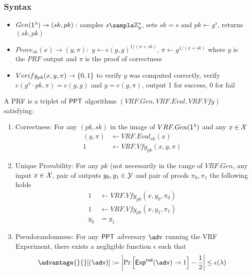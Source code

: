 \subsubsection{Syntax}
\begin{itemize}
    \item $Gen(\mathsf{1^{\lambda}}) \to (sk, pk):$ samples $s \sample \Zp^*$, sets $sk = s$ and $pk \gets g^s$, returns $(sk, pk)$
    \item $Prove_{sk}(x) \to (y, \pi):$ $y \gets e(g,g)^{1/(x+sk)}$, $\pi \gets g^{1/(x+sk)}$ where $y$ is the $PRF$ output and $\pi$ is the proof of correctness
    \item $Verify_{pk}(x, y, \pi) \to \{0,1\}$ to verify $y$ was computed correctly, verify $e(g^x \cdot pk, \pi) = e(g,g)$ and $y = e(g, \pi)$, output 1 for success, 0 for fail
\end{itemize}

\begin{definition}

    A PRF is a triplet of $\mathsf{PPT}$ algorithms $(VRF.Gen, VRF.Eval, VRF.Vfy)$ satisfying:
    \begin{enumerate}
        \item Correctness: For any $(pk, sk)$ in the image of $VRF.Gen(\mathsf{1^{\lambda}})$ and any $x \in \mathcal{X}$
        \[
        \begin{aligned}
            (y, \pi) &\gets VRF.Eval_{sk}(x) \\
            1 &\gets VRF.Vfy_{pk}(x, y, \pi)
        \end{aligned}
        \]


    \item Unique Provability: For any $pk$ (not necessarily in the range of $VRF.Gen$, any input $x \in \mathcal{X}$, pair of outputs $y_0, y_1 \in \mathcal{Y}$ and pair of proofs $\pi_0, \pi_1$ the following holds
    \[
        \begin{aligned}
            1 &\gets VRF.Vfy_{pk}(x,y_0,\pi_0) \\
            1 &\gets VRF.Vfy_{pk}(x,y_1,\pi_1) \\
            y_0 &= y_1
        \end{aligned}
    \]

    \item Pseudorandomness: For any $\mathsf{PPT}$ adversary $\adv$ running the VRF Experiment, there exists a negligible function $\epsilon$ such that 
    \[
         \advantage{}{}[(\adv)] := 
            \left|
        \Pr     \left[ 
                    \mathsf{Exp}^{\mathsf{rnd}}(\adv) \to 1
                \right] - \frac{1}{2}
            \right| \leq \epsilon(\lambda)
    \]
    
    \end{enumerate}

\end{definition}

